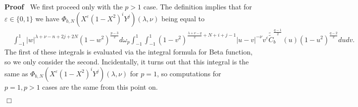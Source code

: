 \documentclass{article}
\renewenvironment{proof}{\noindent\textbf{Proof\ }}{\hspace*{\fill}$\Box$\medskip}
\theoremstyle{remark}
\begin{document}
\begin{proof}
  We first proceed only with the $p > 1$ case. The definition implies that for
  $\varepsilon \in \{ 0, 1 \}$ we have $\Phi_{b, N} (X^{\varepsilon} (1 -
  X^2)^i Y^j) (\lambda, \nu)$ being equal to
  \begin{eqnarray}
    & \int_{- 1}^1 | w |^{\lambda + \nu - n + 2 j + 2 N} (1 - w^2)^{\frac{p -
    3}{2}} d \omega_p \int_{- 1}^1 \int_{- 1}^1 (1 - v^2)^{\frac{\lambda + \nu
    - q}{2} + N + i + j - 1} | u - v |^{- \nu} v^{\varepsilon}
    \widetilde{\tilde{C}}^{\frac{q - 1}{2}}_b (u) (1 - u^2)^{\frac{q - 2}{2}}
    d u d v . &  \nonumber
  \end{eqnarray}
  The first of these integrals is evaluated via the integral formula for Beta
  function, so we only consider the second. Incidentally, it turns out that
  this integral is the same as $\Phi_{b, N} (X^{\varepsilon} (1 - X^2)^i Y^j)
  (\lambda, \nu)$ for $p = 1$, so computations for $p = 1, p > 1$ cases are
  the same from this point on.
  

\end{proof}
\end{document}
